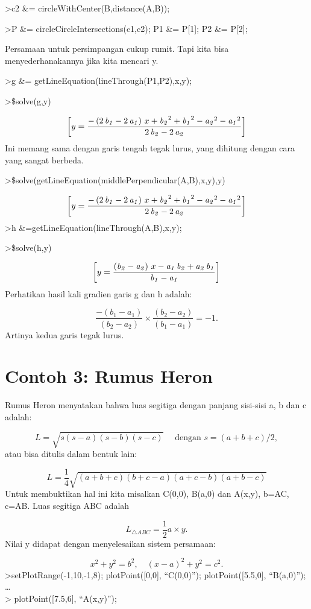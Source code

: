 \documentclass[
]{book}
\begin{document}
\textgreater c2 \&= circleWithCenter(B,distance(A,B));

\textgreater P \&= circleCircleIntersections(c1,c2); P1 \&= P{[}1{]}; P2 \&= P{[}2{]};

Persamaan untuk persimpangan cukup rumit. Tapi kita bisa menyederhanakannya jika kita mencari y.

\textgreater g \&= getLineEquation(lineThrough(P1,P2),x,y);

\textgreater\$solve(g,y)

\[\left[ y=\frac{-\left(2\,{\it b_1}-2\,{\it a_1}\right)\,x+{\it b_2}^2+{\it b_1}^2-{\it a_2}^2-{\it a_1}^2}{2\,{\it b_2}-2\,{\it a_2}}\right]\]Ini memang sama dengan garis tengah tegak lurus, yang dihitung dengan cara yang sangat berbeda.

\textgreater\$solve(getLineEquation(middlePerpendicular(A,B),x,y),y)

\[\left[ y=\frac{-\left(2\,{\it b_1}-2\,{\it a_1}\right)\,x+{\it b_2}^2+{\it b_1}^2-{\it a_2}^2-{\it a_1}^2}{2\,{\it b_2}-2\,{\it a_2}} \right]\]\textgreater h \&=getLineEquation(lineThrough(A,B),x,y);

\textgreater\$solve(h,y)

\[\left[ y=\frac{\left({\it b_2}-{\it a_2}\right)\,x-{\it a_1}\,{\it b_2}+{\it a_2}\,{\it b_1}}{{\it b_1}-{\it a_1}} \right]\] Perhatikan hasil kali gradien garis g dan h adalah:

\[\frac{-(b_1-a_1)}{(b_2-a_2)}\times \frac{(b_2-a_2)}{(b_1-a_1)} = -1.\]Artinya kedua garis tegak lurus.

\chapter{Contoh 3: Rumus Heron}\label{contoh-3-rumus-heron}

Rumus Heron menyatakan bahwa luas segitiga dengan panjang sisi-sisi a, b dan c adalah:

\[L = \sqrt{s(s-a)(s-b)(s-c)}\quad \text{ dengan } s=(a+b+c)/2,\]atau bisa ditulis dalam bentuk lain:

\[L = \frac{1}{4}\sqrt{(a+b+c)(b+c-a)(a+c-b)(a+b-c)}\]Untuk membuktikan hal ini kita misalkan C(0,0), B(a,0) dan A(x,y), b=AC, c=AB. Luas segitiga ABC adalah

\[L_{\triangle ABC}=\frac{1}{2}a\times y.\]Nilai y didapat dengan menyelesaikan sistem persamaan:

\[x^2+y^2=b^2, \quad (x-a)^2+y^2=c^2.\]\textgreater setPlotRange(-1,10,-1,8); plotPoint({[}0,0{]}, ``C(0,0)''); plotPoint({[}5.5,0{]}, ``B(a,0)''); \ldots{}\\
\textgreater{} plotPoint({[}7.5,6{]}, ``A(x,y)'');
\end{document}
